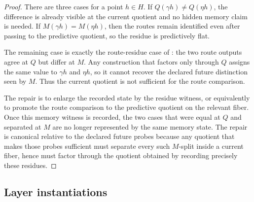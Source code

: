\documentclass[11pt]{article}
\newcommand{\currQ}{Q}                 \newcommand{\predM}{M}                 \newcommand{\splitObs}{\Delta}         \newcommand{\quotMap}{\pi}             \newcommand{\accessQ}{q_I}             \newcommand{\obsSig}{\sigma_I}         \newcommand{\closureForm}{\mathsf{cl}} \newcommand{\BirdInt}{\mathsf{BirdInt}}
\theoremstyle{definition}
\begin{document}
\begin{proof}
There are three cases for a point \(h\in H\).  If
\(\currQ(\gamma h)\ne\currQ(\eta h)\), the difference is already
visible at the current quotient and no hidden memory claim is needed.
If \(\predM(\gamma h)=\predM(\eta h)\), then the routes remain
identified even after passing to the predictive quotient, so the
residue is predictively flat.

The remaining case is exactly the route-residue case of
: the two route outputs agree at \(\currQ\)
but differ at \(\predM\).  Any construction that factors only through
\(\currQ\) assigns the same value to \(\gamma h\) and \(\eta h\), so it
cannot recover the declared future distinction seen by \(\predM\).
Thus the current quotient is not sufficient for the route comparison.

The repair is to enlarge the recorded state by the residue witness,
or equivalently to promote the route comparison to the predictive
quotient on the relevant fiber.  Once this memory witness is recorded,
the two cases that were equal at \(\currQ\) and separated at \(\predM\)
are no longer represented by the same memory state.  The repair is
canonical relative to the declared future probes because any quotient
that makes those probes sufficient must separate every such
\(\predM\)-split inside a current fiber, hence must factor through the
quotient obtained by recording precisely these residues.
\end{proof}

\subsection*{Layer instantiations}\label{layer-inst:F3}
\end{document}
